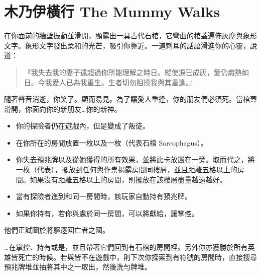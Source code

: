 
\chapter{木乃伊橫行 The Mummy Walks}

\begin{HauntStory}
  在你面前的牆壁振動並滑開，顯露出一具古代石棺，它彎曲的棺蓋遍佈灰塵與象形文字。象形文字發出柔和的光芒，吸引你靠近。一道刺耳的話語滑進你的心靈，說道：
  \begin{quote}
    『我失去我的妻子遠超過你所能理解之時日。縱使淚已成灰，愛仍熾熱如日。今我愛人已為我重生。生者切勿阻撓我與其重逢。』
  \end{quote}
  隨著聲音消逝，你笑了。顯而易見。為了讓愛人重逢，你的朋友們必須死。當棺蓋滑開，你面向你的新朋友…你的新神。
\end{HauntStory}

\vspace*{-1em}
\begin{itemize}
  \item 你的探險者仍在遊戲內，但是變成了叛徒。
  \item 在你所在的房間放置一枚以及一枚（代表石棺 Sarcophagus）。
  \item 你失去預兆牌以及從她獲得的所有效果，並將此卡放置在一旁。取而代之，將一枚（代表），擺放到任何與作祟揭露房間同樓層，並且距離五格以上的房間。如果沒有距離五格以上的房間，則擺放在該樓層盡量越遠越好。
  \item 當有探險者進到和同一房間時，該玩家自動持有預兆牌。
  \item 如果你持有，若你與處於同一房間，可以將獻給，讓掌控。
\end{itemize}

他們正試圖於將驅逐回亡者之國。

…在掌控、持有或是，並且帶著它們回到有石棺的房間裡。另外你亦獲勝於所有英雄皆死亡的時候。若與皆不在遊戲中，則下次你探索到有\OmenSymbol{}符號的房間時，直接搜尋預兆牌堆並抽將其中之一取出，然後洗勻牌堆。

\vfill\null\pagebreak


